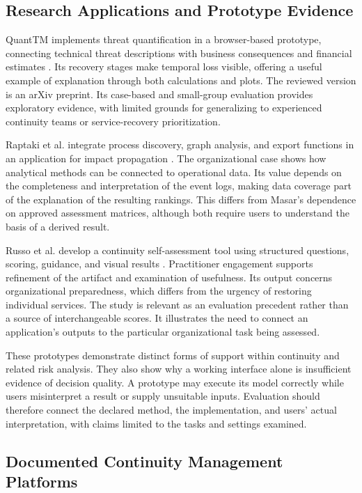 \subsection{Research Applications and Prototype Evidence}
\label{sec:lr_dss_domain}

QuantTM implements threat quantification in a browser-based prototype, connecting technical threat descriptions with business consequences and financial estimates \cite{vonderassen2024quanttm}. Its recovery stages make temporal loss visible, offering a useful example of explanation through both calculations and plots. The reviewed version is an arXiv preprint. Its case-based and small-group evaluation provides exploratory evidence, with limited grounds for generalizing to experienced continuity teams or service-recovery prioritization.

Raptaki et al. integrate process discovery, graph analysis, and export functions in an application for impact propagation \cite{raptaki2025propagation}. The organizational case shows how analytical methods can be connected to operational data. Its value depends on the completeness and interpretation of the event logs, making data coverage part of the explanation of the resulting rankings. This differs from Masar's dependence on approved assessment matrices, although both require users to understand the basis of a derived result.

Russo et al. develop a continuity self-assessment tool using structured questions, scoring, guidance, and visual results \cite{selfassessment2025}. Practitioner engagement supports refinement of the artifact and examination of usefulness. Its output concerns organizational preparedness, which differs from the urgency of restoring individual services. The study is relevant as an evaluation precedent rather than a source of interchangeable scores. It illustrates the need to connect an application's outputs to the particular organizational task being assessed.

These prototypes demonstrate distinct forms of support within continuity and related risk analysis. They also show why a working interface alone is insufficient evidence of decision quality. A prototype may execute its model correctly while users misinterpret a result or supply unsuitable inputs. Evaluation should therefore connect the declared method, the implementation, and users' actual interpretation, with claims limited to the tasks and settings examined.

\subsection{Documented Continuity Management Platforms}
\label{sec:lr_tools}

